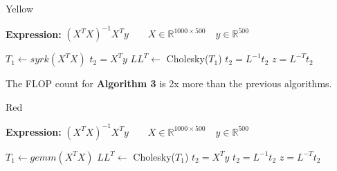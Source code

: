 \documentclass[conference]{IEEEtran}
\begin{document}
\begin{algorithm}
	\renewcommand{\thealgorithm}{}
	\caption{ Yellow }
	\label{alg:a0}
	\textbf{Expression: } $(X^TX)^{-1}X^{T}y \qquad X \in \mathbb{R}^{1000 \times 500} \quad y \in \mathbb{R}^{500}$ 
	\begin{algorithmic}[1] 
		\State $T_1 \leftarrow syrk(X^{T}X)$ 
		\State $t_2 = X^{T}y$ 
		\State $LL^{T} \leftarrow $ Cholesky($T_1$) 
		\State $t_2 = L^{-1}t_2$ 
		\State $z = L^{-T}t_2$
	\end{algorithmic}
\end{algorithm}

The FLOP count for \textbf{Algorithm 3} is 2x more than the previous algorithms.
\begin{algorithm}
	\renewcommand{\thealgorithm}{}
	\caption{ Red }
	\label{alg:a0}
	\textbf{Expression: } $(X^TX)^{-1}X^{T}y \qquad X \in \mathbb{R}^{1000 \times 500} \quad y \in \mathbb{R}^{500}$ 
	\begin{algorithmic}[1] 
		\State $T_1 \leftarrow gemm(X^{T}X)$ 
		\State $LL^{T} \leftarrow $ Cholesky($T_1$) 
		\State $t_2 = X^{T}y$ 
		\State $t_2 = L^{-1}t_2$ 
		\State $z = L^{-T}t_2$
	\end{algorithmic}

\end{algorithm}
\end{document}
